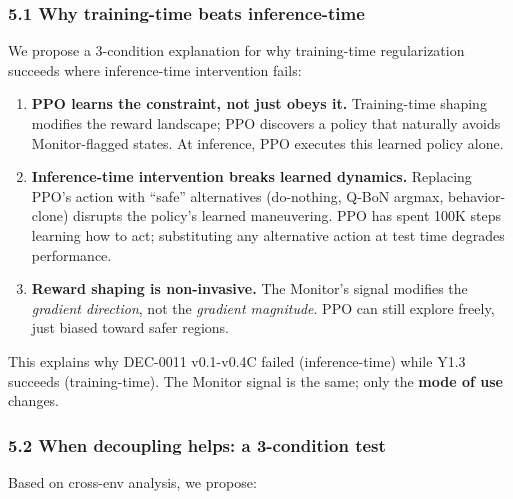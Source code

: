 \documentclass[
]{article}
\begin{document}
\subsubsection{5.1 Why training-time beats
inference-time}\label{why-training-time-beats-inference-time}

We propose a 3-condition explanation for why training-time
regularization succeeds where inference-time intervention fails:

\begin{enumerate}
\def\labelenumi{\arabic{enumi}.}
\item
  \textbf{PPO learns the constraint, not just obeys it.} Training-time
  shaping modifies the reward landscape; PPO discovers a policy that
  naturally avoids Monitor-flagged states. At inference, PPO executes
  this learned policy alone.
\item
  \textbf{Inference-time intervention breaks learned dynamics.}
  Replacing PPO's action with ``safe'' alternatives (do-nothing, Q-BoN
  argmax, behavior-clone) disrupts the policy's learned maneuvering. PPO
  has spent 100K steps learning how to act; substituting any alternative
  action at test time degrades performance.
\item
  \textbf{Reward shaping is non-invasive.} The Monitor's signal modifies
  the \emph{gradient direction}, not the \emph{gradient magnitude}. PPO
  can still explore freely, just biased toward safer regions.
\end{enumerate}

This explains why DEC-0011 v0.1-v0.4C failed (inference-time) while Y1.3
succeeds (training-time). The Monitor signal is the same; only the
\textbf{mode of use} changes.

\subsubsection{5.2 When decoupling helps: a 3-condition
test}\label{when-decoupling-helps-a-3-condition-test}

Based on cross-env analysis, we propose:
\end{document}
